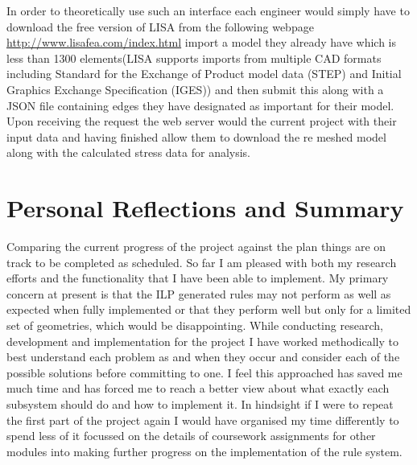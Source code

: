 \documentclass{article}
\begin{document}
\noindent
In order to theoretically use such an interface each engineer would simply have to download the free version of LISA from the following webpage \url{http://www.lisafea.com/index.html} import a model they already have which is less than 1300 elements(LISA supports imports from multiple CAD formats including Standard for the Exchange of Product model data (STEP) and Initial Graphics Exchange Specification (IGES)) \cite{LISAReference} and then submit this along with a JSON file containing edges they have designated as important for their model. Upon receiving the request the web server would the current project with their input data and having finished allow them to download the re meshed model along with the calculated stress data for analysis.


\section{Personal Reflections and Summary}

Comparing the current progress of the project against the plan things are on track to be completed as scheduled. So far I am pleased with both my research efforts and the functionality that I have been able to implement. My primary concern at present is that the ILP generated rules may not perform as well as expected when fully implemented or that they perform well but only for a limited set of geometries, which would be disappointing. While conducting research, development and implementation for the project I have worked methodically to best understand each problem as and when they occur and consider each of the possible solutions before committing to one. I feel this approached has saved me much time and has forced me to reach a better view about what exactly each subsystem should do and how to implement it. In hindsight if I were to repeat the first part of the project again I would have organised my time differently to spend less of it focussed on the details of coursework assignments for other modules into making further progress on the implementation of the rule system.
\end{document}
